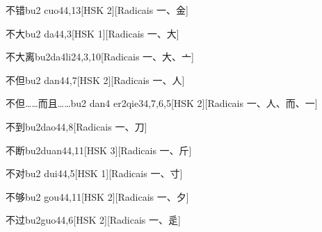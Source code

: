 \begin{entry}{不错}{bu2 cuo4}{4,13}[HSK 2][Radicais ⼀、⾦]
\end{entry}

\begin{entry}{不大}{bu2 da4}{4,3}[HSK 1][Radicais ⼀、⼤]
\end{entry}

\begin{entry}{不大离}{bu2da4li2}{4,3,10}[Radicais ⼀、⼤、⼇]
\end{entry}

\begin{entry}{不但}{bu2 dan4}{4,7}[HSK 2][Radicais ⼀、⼈]
\end{entry}

\begin{entry}{不但……而且……}{bu2 dan4 er2qie3}{4,7,6,5}[HSK 2][Radicais ⼀、⼈、⽽、⼀]
\end{entry}

\begin{entry}{不到}{bu2dao4}{4,8}[Radicais ⼀、⼑]
\end{entry}

\begin{entry}{不断}{bu2duan4}{4,11}[HSK 3][Radicais ⼀、⽄]
\end{entry}

\begin{entry}{不对}{bu2 dui4}{4,5}[HSK 1][Radicais ⼀、⼨]
\end{entry}

\begin{entry}{不够}{bu2 gou4}{4,11}[HSK 2][Radicais ⼀、⼣]
\end{entry}

\begin{entry}{不过}{bu2guo4}{4,6}[HSK 2][Radicais ⼀、⾡]
\end{entry}

